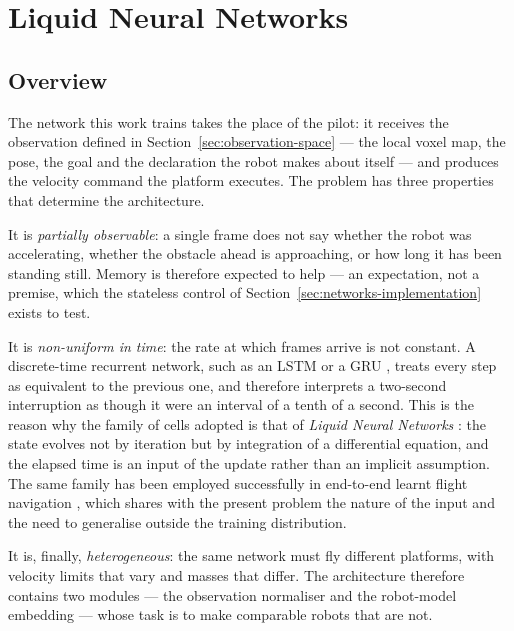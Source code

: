 \chapter{Liquid Neural Networks}
\label{ch:lnn}

\section{Overview}
\label{sec:lnn-overview}

The network this work trains takes the place of the pilot: it receives the
observation defined in Section~\ref{sec:observation-space} --- the local voxel
map, the pose, the goal and the declaration the robot makes about itself --- and
produces the velocity command the platform executes. The problem has three
properties that determine the architecture.

It is \emph{partially observable}: a single frame does not say whether the robot
was accelerating, whether the obstacle ahead is approaching, or how long it has
been standing still. Memory is therefore expected to help --- an expectation,
not a premise, which the stateless control of
Section~\ref{sec:networks-implementation} exists to test.

It is \emph{non-uniform in time}: the rate at which frames arrive is not
constant. A discrete-time recurrent network, such as an LSTM
\cite{hochreiter1997lstm} or a GRU \cite{cho2014gru}, treats every step as
equivalent to the previous one, and therefore interprets a two-second
interruption as though it were an interval of a tenth of a second. This is the
reason why the family of cells adopted is that of \emph{Liquid Neural Networks}
\cite{hasani2021ltc,hasani2022cfc}: the state evolves not by iteration but by
integration of a differential equation, and the elapsed time is an input of the
update rather than an implicit assumption. The same family has been employed
successfully in end-to-end learnt flight navigation \cite{chahine2023flight},
which shares with the present problem the nature of the input and the need to
generalise outside the training distribution.

It is, finally, \emph{heterogeneous}: the same network must fly different
platforms, with velocity limits that vary and masses that differ. The
architecture therefore contains two modules --- the observation normaliser and
the robot-model embedding --- whose task is to make comparable robots that are
not.

